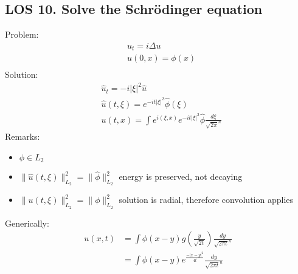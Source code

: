 \documentclass[12pt, a4paper]{article}
\begin{document}
\subsection*{LOS 10. Solve the Schrödinger equation}
Problem:
\begin{align*}
    &u_t = i\Delta u\\
    &u(0, x) = \phi(x)\\
\end{align*}
Solution:
\begin{align*}
    &\hat{u}_t = -i|\xi|^2\hat{u}\\
    &\hat{u}(t, \xi) = e^{-it|\xi|^2}\hat{\phi}(\xi)\\
    &u(t, x) = \int e^{i(\xi, x)}e^{-it|\xi|^2}\hat{\phi}\frac{d\xi}{\sqrt{2\pi}^n}
\end{align*}
Remarks:
\begin{itemize}
    \item $\phi \in L_2$
    \item $\|\hat{u}(t, \xi)\|^2_{L_2} = \|\hat{\phi}\|^2_{L_2}$ energy is preserved, not decaying
    \item $\|u(t, \xi)\|^2_{L_2} = \|\phi\|^2_{L_2}$ solution is radial, therefore convolution applies\\
\end{itemize}
Generically:
\begin{align*}
    u(x, t)&= \int\phi(x-y)g\left(\frac{y}{\sqrt{2t}}\right)\frac{dy}{\sqrt{2\pi t}^n}\\
    &= \int\phi(x-y)e^{\frac{-|x-y|^2}{4t}}\frac{dy}{\sqrt{2\pi t}^n}
\end{align*}
\vspace{0.3em}
\end{document}
